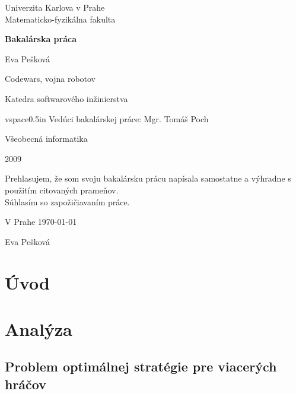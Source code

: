 \documentclass[12pt,a4paper,notitlepage]{report}
\begin{document}
\begin{titlepage}
\begin{center}
\vspace{1.5in}
{\rm Univerzita Karlova v Prahe\\
    Matematicko-fyzikálna fakulta}
\par
\vspace{0.7in}
{\huge \bf Bakalárska práca}
\par
\vspace{0.5in}
{Eva Pešková}
\par
\vspace{0.5in}
Codewars, vojna robotov
\par
\vfill
Katedra softwarového inžinierstva
\par
vspace{0.5in}
Vedúci bakalárskej práce: Mgr. Tomáš Poch
\par
\vspace{0.5in}
Všeobecná informatika
\par
\vspace{0.5in}
2009
\end{center}
\end{titlepage}
\vfill
Prehlasujem, že som svoju bakalársku prácu napísala samostatne a výhradne s použitím citovaných prameňov.\\
Súhlasím so zapožičiavaním práce.\\
\par
V Prahe \today
\begin{flushright}
Eva Pešková
\end{flushright}

\newtheorem{definicia}{Značenie}

\tableofcontents
\chapter{Úvod}%

\chapter{Analýza}
%


\section{Problem optimálnej stratégie pre viacerých hráčov}
\end{document}
